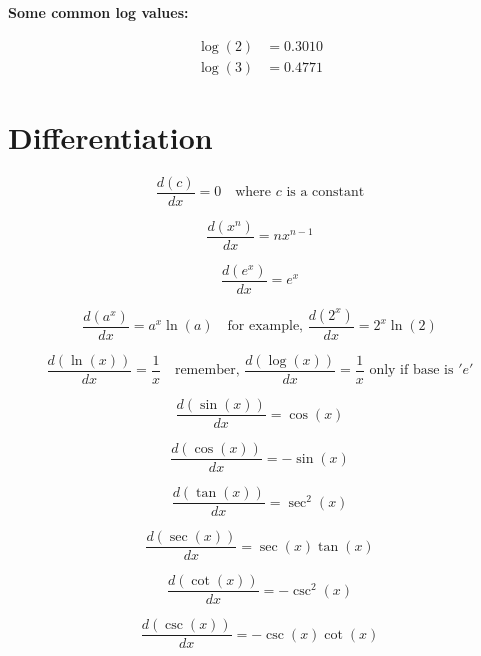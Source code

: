 \documentclass{article}
\begin{document}
\textbf{Some common log values:}

\begin{align*}
\log(2) &= 0.3010 \\
\log(3) &= 0.4771
\end{align*}

\section{Differentiation}

\begin{equation}
\frac{d(c)}{dx} = 0 \quad \text{where } c \text{ is a constant}
\end{equation}

\begin{equation}
\frac{d(x^n)}{dx} = nx^{n-1}
\end{equation}

\begin{equation}
\frac{d(e^x)}{dx} = e^x
\end{equation}

\begin{equation}
\frac{d(a^x)}{dx} = a^x \ln(a) \quad \text{for example, } \frac{d(2^x)}{dx} = 2^x \ln(2)
\end{equation}

\begin{equation}
\frac{d(\ln(x))}{dx} = \frac{1}{x} \quad \text{remember, } \frac{d(\log(x))}{dx} = \frac{1}{x} \text{ only if base is } 'e'
\end{equation}

\begin{equation}
\frac{d(\sin(x))}{dx} = \cos(x)
\end{equation}

\begin{equation}
\frac{d(\cos(x))}{dx} = -\sin(x)
\end{equation}

\begin{equation}
\frac{d(\tan(x))}{dx} = \sec^2(x)
\end{equation}

\begin{equation}
\frac{d(\sec(x))}{dx} = \sec(x)\tan(x)
\end{equation}

\begin{equation}
\frac{d(\cot(x))}{dx} = -\csc^2(x)
\end{equation}

\begin{equation}
\frac{d(\csc(x))}{dx} = -\csc(x)\cot(x)
\end{equation}
\end{document}
